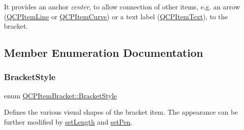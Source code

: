 It provides an anchor {\itshape center}, to allow connection of other items, e.\+g. an arrow (\hyperlink{class_q_c_p_item_line}{Q\+C\+P\+Item\+Line} or \hyperlink{class_q_c_p_item_curve}{Q\+C\+P\+Item\+Curve}) or a text label (\hyperlink{class_q_c_p_item_text}{Q\+C\+P\+Item\+Text}), to the bracket. 

\subsection{Member Enumeration Documentation}
\mbox{\label{class_q_c_p_item_bracket_a7ac3afd0b24a607054e7212047d59dbd}} 
\subsubsection{\texorpdfstring{Bracket\+Style}{BracketStyle}}
{\footnotesize\ttfamily enum \hyperlink{class_q_c_p_item_bracket_a7ac3afd0b24a607054e7212047d59dbd}{Q\+C\+P\+Item\+Bracket\+::\+Bracket\+Style}}

Defines the various visual shapes of the bracket item. The appearance can be further modified by \hyperlink{class_q_c_p_item_bracket_ac7cfc3da7da9b5c5ac5dfbe4f0351b2a}{set\+Length} and \hyperlink{class_q_c_p_item_bracket_ab13001d9cc5d8f9e56ea15bdda682acb}{set\+Pen}.

